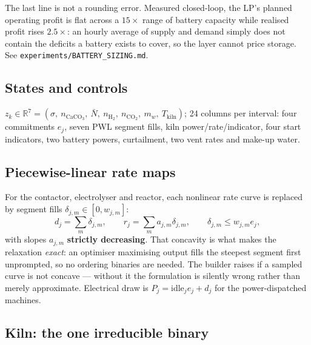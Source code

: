 \documentclass[11pt,a4paper]{article}
\begin{document}
The last line is not a rounding error. Measured closed-loop, the LP's planned
operating profit is flat across a $15\times$ range of battery capacity while
realised profit rises $2.5\times$: an hourly average of supply and demand simply
does not contain the deficits a battery exists to cover, so the layer cannot
price storage. See \texttt{experiments/BATTERY\_SIZING.md}.

\subsection{States and controls}

$z_k\in\mathbb R^7 = (\sigma,\ n_{\mathrm{CaCO_3}},\ \bar N,\ n_{\mathrm{H_2}},\
n_{\mathrm{CO_2}},\ m_w,\ T_{\text{kiln}})$; 24 columns per interval: four
commitments $e_j$, seven PWL segment fills, kiln power/rate/indicator, four start
indicators, two battery powers, curtailment, two vent rates and make-up water.

\subsection{Piecewise-linear rate maps}
\label{sub:pwl}

For the contactor, electrolyser and reactor, each nonlinear rate curve is
replaced by segment fills $\delta_{j,m}\in[0,w_{j,m}]$:
\begin{equation}
d_j = \sum_m \delta_{j,m}, \qquad r_j = \sum_m a_{j,m}\delta_{j,m},
\qquad \delta_{j,m} \le w_{j,m} e_j ,
\end{equation}
with slopes $a_{j,m}$ \textbf{strictly decreasing}. That concavity is what makes
the relaxation \emph{exact}: an optimiser maximising output fills the steepest
segment first unprompted, so no ordering binaries are needed. The builder raises
if a sampled curve is not concave --- without it the formulation is silently
wrong rather than merely approximate. Electrical draw is
$P_j = \text{idle}_j e_j + d_j$ for the power-dispatched machines.

\subsection{Kiln: the one irreducible binary}
\label{sub:kiln}
\end{document}

